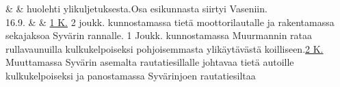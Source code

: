 \documentclass[11pt,a5paper,oneside]{book}
\begin{document}
\newpage

& & huolehti ylikuljetuksesta.\newline\newline\newline Osa esikunnasta siirtyi Vaseniin. \newline\newline\newline\newline\newline\newline \\

16.9. & & \underline{1 K.} 2 joukk. kunnostamassa tietä moottorilautalle ja rakentamassa sekajaksoa Syvärin rannalle. 1 Joukk. kunnostamassa Muurmannin rataa rullavaunuilla kulkukelpoiseksi pohjoisemmasta ylikäytävästä koilliseen.\newline\newline \underline{2 K.} Muuttamassa Syvärin asemalta rautatiesillalle johtavaa tietä autoille kulkukelpoiseksi ja panostamassa Syvärinjoen rautatiesiltaa \\

\taulustop


\end{document}
